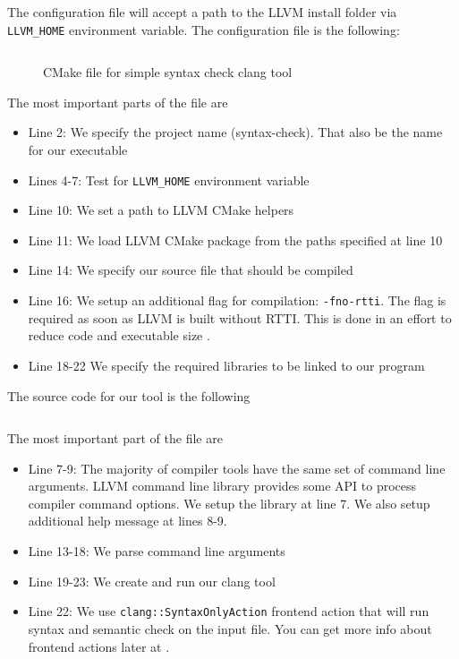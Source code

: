 The configuration file will accept a path to the LLVM install folder via
\texttt{LLVM_HOME} environment variable. The configuration file is the
following:
\begin{figure}[H]
  \inputminted{cmake}{./src/part1/ch1_setup/syntaxcheck/CMakeLists.txt}
  \label{lis:cmake_sytax_check}
  \caption{CMake file for simple syntax check clang tool}
\end{figure}
The most important parts of the file are
\begin{itemize}
\item Line 2: We specify the project name (syntax-check). That also be the name
  for our executable 
\item Lines 4-7: Test for \texttt{LLVM_HOME} environment variable
\item Line 10: We set a path to LLVM CMake helpers
\item Line 11: We load LLVM CMake package from the paths specified at line 10
\item Line 14: We specify our source file that should be compiled
\item Line 16: We setup an additional flag for compilation:
  \texttt{-fno-rtti}. The flag is required as soon as LLVM is built without
  RTTI. This is done in an effort to reduce code and executable size
  \citep{llvm:coding_standards}.   
\item Line 18-22 We specify the required libraries to be linked to our
  program 
\end{itemize}

The source code for our tool is the following
\inputminted{c++}{./src/part1/ch1_setup/syntaxcheck/SyntaxCheck.cpp}
The most important part of the file are
\begin{itemize}
\item Line 7-9: The majority of compiler tools have the same set of command line
  arguments. LLVM command line library \citep{llvm:commandline_library}
  provides some API to process compiler command options. We setup the library
  at line 7. We also setup additional help message at lines 8-9. 
\item Line 13-18: We parse command line arguments
\item Line 19-23: We create and run our clang tool
\item Line 22: We use \texttt{clang::SyntaxOnlyAction} frontend action that
  will run syntax and semantic check on the input file. You can get more info
  about frontend actions later at .
\end{itemize}

